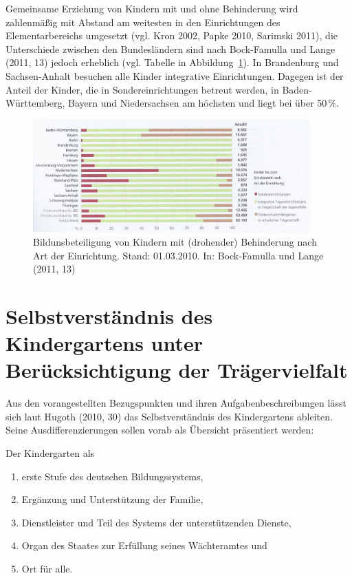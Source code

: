Gemeinsame Erziehung von Kindern mit und ohne Behinderung wird zahlenmäßig mit Abstand am weitesten in den Einrichtungen des Elementarbereichs umgesetzt (vgl. Kron 2002, Papke 2010, Sarimski 2011), die Unterschiede zwischen den Bundesländern sind nach Bock-Famulla und Lange (2011, 13) jedoch erheblich (vgl. Tabelle in Abbildung~\ref{bild:bildungsbeteiligung}). In Brandenburg und Sachsen-Anhalt besuchen alle Kinder integrative Einrichtungen. Dagegen ist der Anteil der Kinder, die in Sondereinrichtungen betreut werden, in Baden-Württemberg, Bayern und Niedersachsen am höchsten und liegt bei über 50\,\%. 
\begin{figure}
  \centering
  \includegraphics[width=0.95\textwidth]{bilder/bildungsbeteiligung}
  \caption{Bildunsbeteiligung von Kindern mit (drohender) Behinderung nach Art der Einrichtung. Stand: 01.03.2010. In: Bock-Famulla und Lange (2011, 13)}
  \label{bild:bildungsbeteiligung}
\end{figure}


\section{Selbstverständnis des Kindergartens unter Berücksichtigung der Trägervielfalt}\label{sec:kitaSelbst}
Aus den vorangestellten Bezugspunkten und ihren Aufgabenbeschreibungen lässt sich laut Hugoth (2010, 30) das Selbstverständnis des Kindergartens ableiten. Seine Ausdifferenzierungen sollen vorab als Übersicht präsentiert werden:

Der Kindergarten als
\begin{enumerate}
\item erste Stufe des deutschen Bildungssystems,
\item Ergänzung und Unterstützung der Familie,
\item Dienstleister und Teil des Systems der unterstützenden Dienste,
\item Organ des Staates zur Erfüllung seines Wächteramtes und 
\item Ort für alle.
\end{enumerate}

